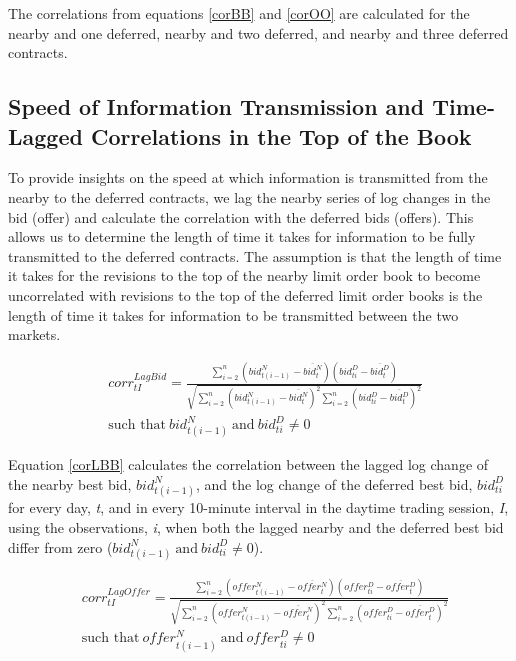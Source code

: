 \documentclass[review,12pt]{elsarticle}
\begin{document}
\begin{linenumbers}
The correlations from equations \ref{corBB} and \ref{corOO} are
calculated for the nearby and one deferred, nearby and two deferred, and
nearby and three deferred contracts.

\subsection{Speed of Information Transmission and Time-Lagged
Correlations in the Top of the
Book}\label{speed-of-information-transmission-and-time-lagged-correlations-in-the-top-of-the-book}

To provide insights on the speed at which information is transmitted
from the nearby to the deferred contracts, we lag the nearby series of
log changes in the bid (offer) and calculate the correlation with the
deferred bids (offers). This allows us to determine the length of time
it takes for information to be fully transmitted to the deferred
contracts. The assumption is that the length of time it takes for the
revisions to the top of the nearby limit order book to become
uncorrelated with revisions to the top of the deferred limit order books
is the length of time it takes for information to be transmitted between
the two markets.

\begin{equation} \label{corLBB}
\begin{split}
& corr^{LagBid}_{tI} = \frac{\sum\limits_{i=2}^{n} \left(bid_{t(i-1)}^N - \overline{bid_t^N}\right) \left(bid_{ti}^D - \overline{bid_t^D}\right)}{\sqrt{\sum\limits_{i=2}^{n} \left(bid_{t(i-1)}^N - \overline{bid_t^N}\right)^2 \sum\limits_{i=2}^{n}\left(bid_{ti}^D - \overline{bid_t^D}\right)^2}} \\
& \textrm{such that} \: {bid_{t(i-1)}^N \: \textrm{and} \: bid_{ti}^D} \neq 0 
\end{split}
\end{equation}

Equation \ref{corLBB} calculates the correlation between the lagged log
change of the nearby best bid, \(bid_{t(i-1)}^N\), and the log change of
the deferred best bid, \(bid_{ti}^D\) for every day, \emph{t}, and in
every 10-minute interval in the daytime trading session, \emph{I}, using
the observations, \emph{i}, when both the lagged nearby and the deferred
best bid differ from zero
(\({bid_{t(i-1)}^N \: \textrm{and} \: bid_{ti}^D} \neq 0\)).

\begin{equation} \label{corLOO}
\begin{split}
& corr^{LagOffer}_{tI}  = \frac{\sum\limits_{i=2}^{n} \left(offer_{t(i-1)}^N - \overline{offer_t^N}\right) \left(offer_{ti}^D - \overline{offer_t^D}\right)}{\sqrt{\sum\limits_{i=2}^{n} \left(offer_{t(i-1)}^N - \overline{offer_t^N}\right)^2 \sum\limits_{i=2}^{n}\left(offer_{ti}^D - \overline{offer_t^D}\right)^2}} \\
& \textrm{such that} \: {offer_{t(i-1)}^N \: \textrm{and} \: offer_{ti}^D} \neq 0
\end{split}
\end{equation}


\end{linenumbers}
\end{document}
